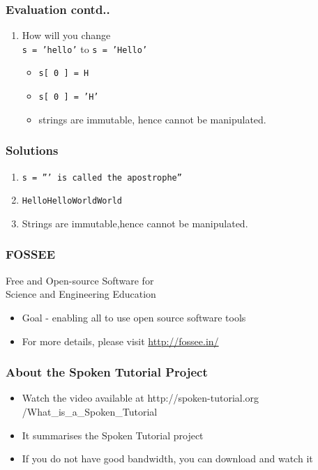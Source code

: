 \documentclass[17pt,compress]{beamer}
\newcounter{saveenumi}
\newcommand{\conti}{\setcounter{enumi}{\value{saveenumi}}}
\begin{document}
\begin{frame}
\frametitle{Evaluation contd..}
\label{sec-6.2}


\begin{enumerate}
\conti
\item How will you change\\ \texttt{s = 'hello'} to \texttt{s = 'Hello'}\pause
\begin{itemize}
\item \texttt{s[ 0 ] =  H}
\item \texttt{s[ 0 ] = 'H'}
\item strings are immutable, hence cannot be manipulated.
\end{itemize}
\end{enumerate}
\end{frame}
\begin{frame}
\frametitle{Solutions}
\label{sec-7}


\begin{enumerate}
\item \texttt{s = ''' is called the apostrophe''}\pause
\vspace{8pt}
\item \texttt{HelloHelloWorldWorld}\pause
\vspace{8pt}
\item Strings are immutable,hence cannot be manipulated.
\end{enumerate}
\end{frame}
\begin{frame}
\frametitle{FOSSEE}
{\color{blue}Free and Open-source Software for \\Science and Engineering Education} \\
\begin{itemize}
\item Goal - enabling all to use open source software tools
\item For more details, please visit {\color{blue}\url{http://fossee.in/}}
\end{itemize}
\end{frame}
\begin{frame}
\frametitle{About the Spoken Tutorial Project}
\begin{itemize}
\item Watch the video available at {\color{blue}http://spoken-tutorial.org /What\_is\_a\_Spoken\_Tutorial}
\item It summarises the Spoken Tutorial project \pause
\item If you do not have good bandwidth, you can download and watch it
\end{itemize}
\end{frame}
\end{document}

